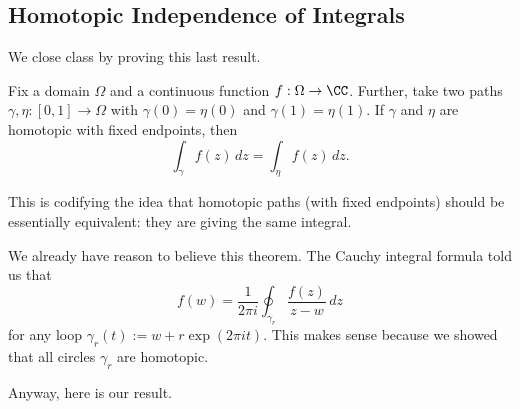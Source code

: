 \subsection{Homotopic Independence of Integrals}
We close class by proving this last result.
\begin{theorem} \label{thm:homoind}
	Fix a domain $\Omega$ and a continuous function $f:\Omega\to\CC$. Further, take two paths $\gamma,\eta:[0,1]\to\Omega$ with $\gamma(0)=\eta(0)$ and $\gamma(1)=\eta(1)$. If $\gamma$ and $\eta$ are homotopic with fixed endpoints, then
	\[\int_\gamma f(z)\,dz=\int_\eta f(z)\,dz.\]
\end{theorem}
This is codifying the idea that homotopic paths (with fixed endpoints) should be essentially equivalent: they are giving the same integral.
\begin{example}
	We already have reason to believe this theorem. The Cauchy integral formula told us that
	\[f(w)=\frac1{2\pi i}\oint_{\gamma_r}\frac{f(z)}{z-w}\,dz\]
	for any loop $\gamma_r(t):=w+r\exp(2\pi it)$. This makes sense because we showed that all circles $\gamma_r$ are homotopic.
\end{example}
Anyway, here is our result.
